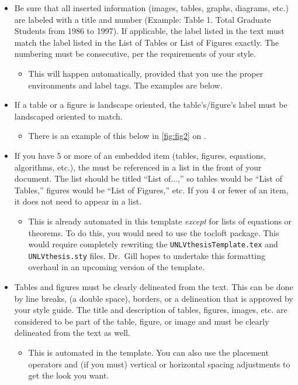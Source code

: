 \begin{itemize}
	\item Be sure that all inserted information (images, tables, graphs, diagrams, etc.) are labeled with a title and number (Example: Table 1. Total Graduate Students from 1986 to 1997). If applicable, the label listed in the text must match the label listed in the List of Tables or List of Figures exactly. The numbering must be consecutive, per the requirements of your style.
		\begin{itemize}
			\item This will happen automatically, provided that you use the proper environments and label tags. The examples are below. 
		\end{itemize}
	\item If a table or a figure is landscape oriented, the table's/figure's label must be landscaped oriented to match.
		\begin{itemize}
			\item There is an example of this below in \cref{fig:fig2} on . 
		\end{itemize}
	\item If you have 5 or more of an embedded item (tables, figures, equations, algorithms, etc.), the must be referenced in a list in the front of your document. The list should be titled ``List of...,'' so tables would be ``List of Tables,''  figures would be ``List of Figures,'' etc. If you 4 or fewer of an item, it does not need to appear in a list. 
		\begin{itemize}
			\item This is already automated in this template \textit{except} for lists of equations or theorems. To do this, you would need to use the \textsf{tocloft} package. This would require completely rewriting the \texttt{UNLVthesisTemplate.tex} and \texttt{UNLVthesis.sty} files. Dr.\ Gill hopes to undertake this formatting overhaul in an upcoming version of the template.
		\end{itemize}	
	\item Tables and figures must be clearly delineated from the text. This can be done by line breaks, (a double space), borders, or a delineation that is approved by your style guide. The title and description of tables, figures, images, etc. are considered to be part of the table, figure, or image and must be clearly delineated from the text as well.
		\begin{itemize}
			\item This is automated in the template. You can also use the placement operators and (if you must) vertical or horizontal spacing adjustments to get the look you want. 

\end{itemize}
\end{itemize}
